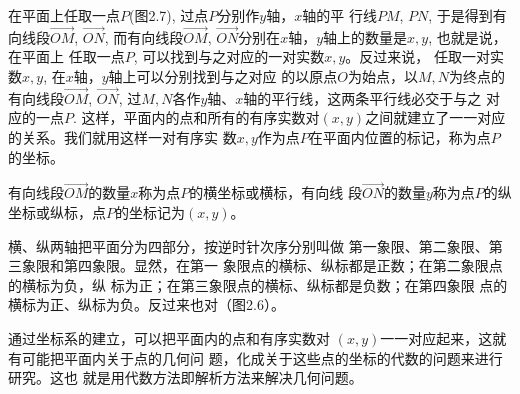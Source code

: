 \begin{figure}[htp]
\centering
\begin{minipage}[t]{0.48\textwidth}
\centering
{}
\caption{}
\end{minipage}
\begin{minipage}[t]{0.48\textwidth}
\centering
{}
\caption{}
\end{minipage}
\end{figure}



在平面上任取一点$P$(图2.7), 过点$P$分别作$y$轴，$x$轴的平
行线$PM$, $PN$, 于是得到有向线段$\Vec{OM}$, $\Vec{ON}$, 而有向线段$\Vec{OM}$, $\Vec{ON}$分别在$x$轴，$y$轴上的数量是$x,y$, 也就是说，在平面上
任取一点$P$, 可以找到与之对应的一对实数$x,y$。反过来说，
任取一对实数$x,y$, 在$x$轴，$y$轴上可以分别找到与之对应
的以原点$O$为始点，以$M,N$为终点的有向线段$\Vec{OM}$, $\Vec{ON}$,
过$M,N$各作$y$轴、$x$轴的平行线，这两条平行线必交于与之
对应的一点$P$. 这样，平面内的点和所有的有序实数对$(x,y)$之间就建立了一一对应的关系。我们就用这样一对有序实
数$x,y$作为点$P$在平面内位置的标记，称为点$P$的坐标。

有向线段$\Vec{OM}$的数量$x$称为点$P$的横坐标或横标，有向线
段$\Vec{ON}$的数量$y$称为点$P$的纵坐标或纵标，点$P$的坐标记为$(x,
y)$。

横、纵两轴把平面分为四部分，按逆时针次序分别叫做
第一象限、第二象限、第三象限和第四象限。显然，在第一
象限点的横标、纵标都是正数；在第二象限点的横标为负，纵
标为正；在第三象限点的横标、纵标都是负数；在第四象限
点的横标为正、纵标为负。反过来也对（图2.6）。

通过坐标系的建立，可以把平面内的点和有序实数对
$(x,y)$一一对应起来，这就有可能把平面内关于点的几何问
题，化成关于这些点的坐标的代数的问题来进行研究。这也
就是用代数方法即解析方法来解决几何问题。

